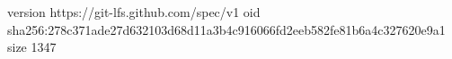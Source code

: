 version https://git-lfs.github.com/spec/v1
oid sha256:278c371ade27d632103d68d11a3b4c916066fd2eeb582fe81b6a4c327620e9a1
size 1347
